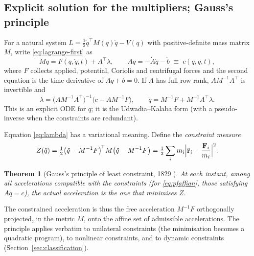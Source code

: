 \documentclass[11pt,a4paper]{article}
\theoremstyle{definition}
\theoremstyle{plain}
\newtheorem{theorem}{Theorem}[section]
\theoremstyle{remark}
\newcommand{\transp}{^{\!\top}}
\begin{document}
\subsection{Explicit solution for the multipliers; Gauss's principle}\label{sec:gauss}
For a natural system $L=\tfrac12\dot q\transp M(q)\dot q-V(q)$ with positive-definite mass
matrix $M$, write \eqref{eq:lagrange-first} as
\begin{equation}\label{eq:dae}
  M\ddot q=F(q,\dot q,t)+A\transp\lambda,\qquad A\ddot q=-\dot A\dot q-\dot b\;\equiv\;c(q,\dot q,t),
\end{equation}
where $F$ collects applied, potential, Coriolis and centrifugal forces and the second
equation is the time derivative of $A\dot q+b=0$. If $A$ has full row rank, $AM^{-1}A\transp$
is invertible and
\begin{equation}\label{eq:lambda}
  \lambda=\bigl(AM^{-1}A\transp\bigr)^{-1}\bigl(c-AM^{-1}F\bigr),\qquad
  \ddot q=M^{-1}F+M^{-1}A\transp\lambda.
\end{equation}
This is an explicit ODE for $q$; it is the Udwadia--Kalaba form \cite{UdwadiaKalaba1992}
(with a pseudo-inverse when the constraints are redundant).

Equation \eqref{eq:lambda} has a variational meaning. Define the \emph{constraint measure}
\begin{equation}\label{eq:gauss}
  Z(\ddot q)=\tfrac12\bigl(\ddot q-M^{-1}F\bigr)\transp M\bigl(\ddot q-M^{-1}F\bigr)
  =\tfrac12\sum_i m_i\Bigl|\ddot{\mathbf r}_i-\frac{\mathbf F_i}{m_i}\Bigr|^2 .
\end{equation}

\begin{theorem}[Gauss's principle of least constraint, 1829 \cite{Gauss1829}]
At each instant, among all accelerations compatible with the constraints (for \eqref{eq:pfaffian},
those satisfying $A\ddot q=c$), the actual acceleration is the one that minimises $Z$.
\end{theorem}

The constrained acceleration is thus the free acceleration $M^{-1}F$ orthogonally
projected, in the metric $M$, onto the affine set of admissible accelerations. The principle
applies verbatim to unilateral constraints (the minimisation becomes a quadratic program),
to nonlinear constraints, and to dynamic constraints (Section~\ref{sec:classification}).
\end{document}
